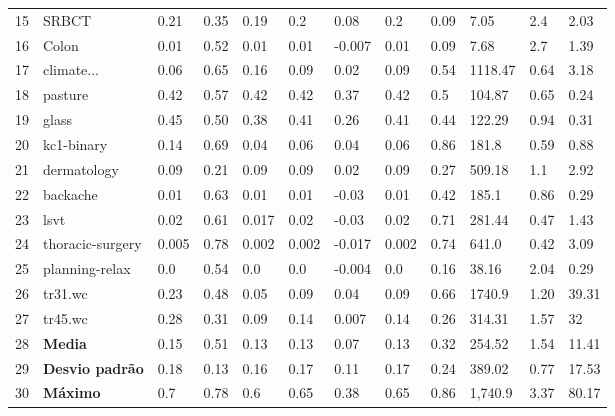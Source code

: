 \documentclass[sn-mathphys,Numbered]{sn-jnl}%
\theoremstyle{thmstyleone}%
\theoremstyle{thmstyletwo}%
\theoremstyle{thmstylethree}%
\begin{document}
\begin{table}[ht]
\begin{tabular}{@{}p{0.1cm}p{2.3cm}p{1.3cm}p{1cm}p{1cm}p{0.8cm}p{1cm}p{1cm}p{0.8cm}p{1cm}p{1cm}p{0.8cm}@{}}
        15 & SRBCT & 0.21 & 0.35 & 0.19 & 0.2 & 0.08 & 0.2 & 0.09 & 7.05 & 2.4 & 2.03\\
        16 & Colon & 0.01 & 0.52 & 0.01 & 0.01 & -0.007 & 0.01 & 0.09 & 7.68 & 2.7 & 1.39\\
        17 & climate...& 0.06 & 0.65 & 0.16 & 0.09 & 0.02 & 0.09 & 0.54 & 1118.47 & 0.64 & 3.18\\
        18 & pasture & 0.42 & 0.57 & 0.42 & 0.42 & 0.37 & 0.42 & 0.5 & 104.87 & 0.65 & 0.24\\
        19 & glass & 0.45 & 0.50 & 0.38 & 0.41 & 0.26 & 0.41 & 0.44 & 122.29 & 0.94 & 0.31\\
        20 & kc1-binary & 0.14 & 0.69 & 0.04 & 0.06 & 0.04 & 0.06 & 0.86 & 181.8 & 0.59 & 0.88\\
        21 & dermatology & 0.09 & 0.21 & 0.09 & 0.09 & 0.02 & 0.09 & 0.27 & 509.18 & 1.1 & 2.92\\
        22 & backache & 0.01 & 0.63 & 0.01 & 0.01 & -0.03 & 0.01 & 0.42 & 185.1 & 0.86 & 0.29\\
        23 & lsvt & 0.02 & 0.61 & 0.017 & 0.02 & -0.03 & 0.02 & 0.71 & 281.44 & 0.47 & 1.43\\
        24 & thoracic-surgery & 0.005 & 0.78 & 0.002 & 0.002 & -0.017 & 0.002 & 0.74 & 641.0 & 0.42 & 3.09\\
        25 & planning-relax & 0.0 & 0.54 & 0.0 & 0.0 & -0.004 & 0.0 & 0.16 & 38.16 & 2.04 & 0.29\\
        26 & tr31.wc & 0.23 & 0.48 & 0.05 & 0.09 & 0.04 & 0.09 & 0.66 & 1740.9 & 1.20 & 39.31\\
        27 & tr45.wc & 0.28 & 0.31 & 0.09 & 0.14 & 0.007 & 0.14 & 0.26 & 314.31 & 1.57 & 32\\
        \midrule
        28 & \textbf{Media} & 0.15 & 0.51 & 0.13 & 0.13 & 0.07 & 0.13 & 0.32 & 254.52 & 1.54 & 11.41 \\
        29 & \textbf{Desvio padrão} & 0.18 & 0.13 & 0.16 & 0.17 & 0.11  & 0.17 & 0.24 & 389.02 & 0.77 & 17.53 \\
        30 & \textbf{Máximo} & 0.7 & 0.78 & 0.6 & 0.65 & 0.38 & 0.65 & 0.86 & 1,740.9 & 3.37 & 80.17 \\
        \bottomrule
    \end{tabular}
    \label{tab:reskmeans}
\end{table}
\end{document}
